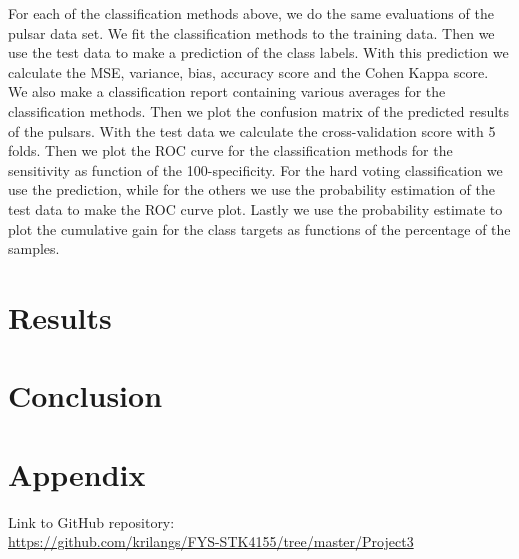 \documentclass[12pt,a4paper,english]{article}
\begin{document}
For each of the classification methods above, we do the same evaluations of the pulsar data set. We fit the classification methods to the training data. Then we use the test data to make a prediction of the class labels. With this prediction we calculate the MSE, variance, bias, accuracy score and the Cohen Kappa score. We also make a classification report containing various averages for the classification methods. Then we plot the confusion matrix of the predicted results of the pulsars. With the test data we calculate the cross-validation score with 5 folds. Then we plot the ROC curve for the classification methods for the sensitivity as function of the 100-specificity. For the hard voting classification we use the prediction, while for the others we use the probability estimation of the test data to make the ROC curve plot. Lastly we use the probability estimate to plot the cumulative gain for the class targets as functions of the percentage of the samples.

\section{Results}
\label{sect:Results}
\section{Conclusion}
\label{sect:Conclusion}

\appendix
\section{Appendix}
\label{sect:Appendix}
Link to GitHub repository:\\
\url{https://github.com/krilangs/FYS-STK4155/tree/master/Project3}



\end{document}

